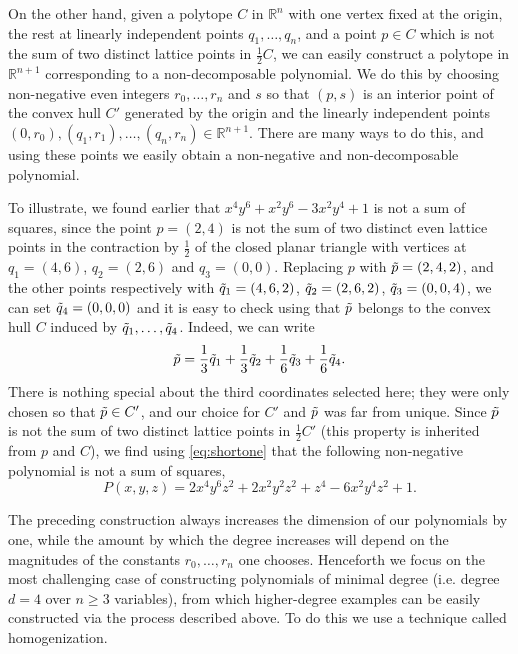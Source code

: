 \documentclass[oneside,hidelinks,indentfirst,10pt]{book}
\begin{document}
On the other hand, given a polytope \(C\) in \(\mathbb{R}^n\) with one vertex fixed at the origin, the rest at linearly independent points \(q_1,\dots,q_n\), and a point \(p\in C\) which is not the sum of two distinct lattice points in \(\frac{1}{2}C\), we can easily construct a polytope in \(\mathbb{R}^{n+1}\) corresponding to a non-decomposable polynomial. We do this by choosing non-negative even integers \(r_0,\dots,r_n\) and \(s\) so that \((p,s)\) is an interior point of the convex hull \(C'\) generated by the origin and the linearly independent points \((0,r_0),(q_1,r_1),\dots,(q_n,r_n)\in \mathbb{R}^{n+1}\). There are many ways to do this, and using these points we easily obtain a non-negative and non-decomposable polynomial.


To illustrate, we found earlier that \(x^4y^6+x^2y^6-3x^2y^4+1\) is not a sum of squares, since the point \(p=(2,4)\) is not the sum of two distinct even lattice points in the contraction by \(\frac{1}{2}\) of the closed planar triangle with vertices at \(q_1=(4,6)\), \(q_2=(2,6)\) and \(q_3=(0,0)\). Replacing \(p\) with \(\Tilde{p}=(2,4,2)\), and the other points respectively with \(\Tilde{q}_1=(4,6,2)\), \(\Tilde{q}_2=(2,6,2)\), \(\Tilde{q}_3=(0,0,4)\), we can set \(\Tilde{q}_4=(0,0,0)\) and it is easy to check using  that \(\Tilde{p}\) belongs to the convex hull \(C\) induced by \(\Tilde{q}_1,\dots,\Tilde{q}_4\). Indeed, we can write
\[
    \Tilde{p}=\frac{1}{3}\Tilde{q}_1+\frac{1}{3}\Tilde{q}_2+\frac{1}{6}\Tilde{q}_3+\frac{1}{6}\Tilde{q}_4.
\]
There is nothing special about the third coordinates selected here; they were only chosen so that \(\Tilde{p}\in C'\), and our choice for \(C'\) and \(\Tilde{p}\) was far from unique. Since \(\Tilde{p}\) is not the sum of two distinct lattice points in \(\frac{1}{2}C'\) (this property is inherited from \(p\) and \(C\)), we find using \eqref{eq:shortone} that the following non-negative polynomial is not a sum of squares,
\[
    P(x,y,z)=2x^4y^6z^2+2x^2y^2z^2+z^4-6x^2y^4z^2+1.
\]


The preceding construction always increases the dimension of our polynomials by one, while the amount by which the degree increases will depend on the magnitudes of the constants \(r_0,\dots,r_n\) one chooses. Henceforth we focus on the most challenging case of constructing polynomials of minimal degree (i.e. degree \(d=4\) over \(n\geq 3\) variables), from which higher-degree examples can be easily constructed via the process described above. To do this we use a technique called homogenization.
\end{document}
